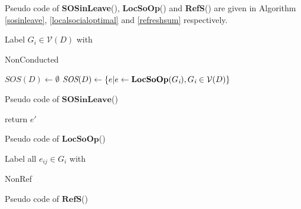 \documentclass{acm_proc_article-sp}
\begin{document}
Pseudo code of \textbf{SOSinLeave}(), \textbf{LocSoOp}() and \textbf{RefS}() are given in Algorithm \ref{sosinleave}, \ref{localsocialoptimal} and \ref{refreshsum} respectively.
\begin{algorithm}[!h]
\scriptsize
 Label $G_{\textit{i}}\in \mathcal{V}(D)$ with \begin{bf}NonConducted\end{bf}\;
 $\textit{SOS}(D)\leftarrow \emptyset$\;
 $\textit{SOS}(D)\leftarrow \{e|e\leftarrow \begin{bf}LocSoOp\end{bf}(G_{\textit{i}}), G_{\textit{i}}\in \mathcal{V}(D)\}$\;
 \caption{Pseudo code of $\mathbf{SOSinLeave}$()}
 \label{sosinleave}
\end{algorithm}
\begin{algorithm}[!h]
\scriptsize
 return $e'$\;
 \caption{Pseudo code of $\mathbf{LocSoOp}$()}
 \label{localsocialoptimal}
\end{algorithm}
\begin{algorithm}[!h]
\scriptsize
 Label all $e_{\textit{ij}}\in G_{\textit{i}}$ with \begin{bf}NonRef\end{bf}\;
 \caption{Pseudo code of $\mathbf{RefS}$()}
 \label{refreshsum}
\end{algorithm}
\end{document}
